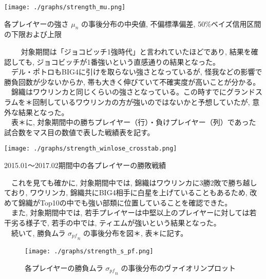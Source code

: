 \documentclass[uplatex,9pt,a5j]{jsarticle}
\begin{document}
\begin{table}[htbp]
  \begin{center}
    \texttt{[image: ./graphs/strength\_mu.png]}
    \caption{各プレイヤーの強さ $\mu_n$ の事後分布の中央値, 不偏標準偏差, 50\%ベイズ信用区間の下限および上限}
    \label{tb:tb_strength_mu}
  \end{center}
\end{table}
　対象期間は「ジョコビッチ1強時代」と言われていたほどであり, 結果を確認しても, ジョコビッチが1番強いという直感通りの結果となった。\\
　デル・ポトロもBIG4に引けを取らない強さとなっているが, 怪我などの影響で勝負回数が少ないからか, 帯も大きく伸びていて不確実度が高いことが分かる。\\
　錦織はワウリンカと同じくらいの強さとなっている。この時すでにグランドスラムを＊回制しているワウリンカの方が強いのではないかと予想していたが, 意外な結果となった。\\
　表＊に, 対象期間中の勝ちプレイヤー（行）・負けプレイヤー（列）であった試合数をマス目の数値で表した戦績表を記す。\\
\begin{table}[htbp]
  \begin{center}
    \texttt{[image: ./graphs/strength\_winlose\_crosstab.png]}
    \caption{2015.01〜2017.02期間中の各プレイヤーの勝敗戦績}
    \label{tb:tb_strength_winlose_crosstab}
  \end{center}
\end{table}
　これを見ても確かに, 対象期間中では, 錦織はワウリンカに3勝2敗で勝ち越しており, ワウリンカ, 錦織共にBIG4相手に白星を上げていることもあるため, 改めて錦織がTop10の中でも強い部類に位置していることを確認できた。\\
　また, 対象期間中では, 若手プレイヤーは中堅以上のプレイヤーに対しては若干劣る様子で, 若手の中では, ティエムが強いという結果となった。\\
　続いて, 勝負ムラ ${\sigma_{pf}}_n$ の事後分布を図＊, 表＊に記す。\\
\begin{figure}[htbp]
  \begin{center}
    \texttt{[image: ./graphs/strength\_s\_pf.png]}
    \caption{各プレイヤーの勝負ムラ ${\sigma_{pf}}_n$ の事後分布のヴァイオリンプロット}
    \label{fig:fig_strength_s_pf}
  \end{center}
\end{figure}
\end{document}
